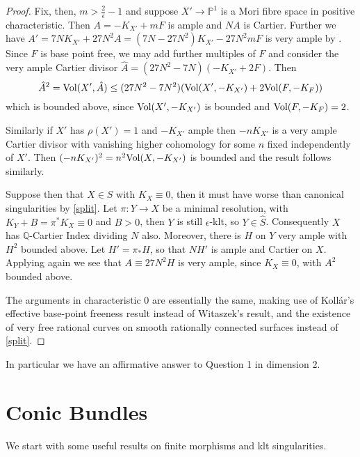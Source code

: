 \begin{proof}
	Fix, then, $m > \frac{2}{\epsilon}-1$ and suppose $X'\to \mathbb{P}^{1}$ is a Mori fibre space in positive characteristic. Then $A=-K_{X'} +mF$ is ample and $NA$ is Cartier. Further we have $A'=7NK_{X'}+27N^{2}A=(7N-27N^{2})K_{X'}-27N^{2}mF$ is very ample by \cite[Theorem 4.1]{witaszek2015effective}. Since $F$ is base point free, we may add further multiples of $F$ and consider the very ample Cartier divisor $\hat{A}=(27N^{2}-7N)(-K_{X'}+2F)$. Then $$\hat{A}^{2}=\text{Vol}(X',\hat{A})\leq (27N^{2}-7N^{2})(\text{Vol}(X',-K_{X'})+2\text{Vol}(F,-K_{F}))$$ which is bounded above, since $\text{Vol}(X',-K_{X'})$ is bounded and $\text{Vol}(F,-K_{F})=2$. 
	
	Similarly if $X'$ has $\rho(X')=1$ and $-K_{X'}$ ample then $-nK_{X'}$ is a very ample Cartier divisor with vanishing higher cohomology for some $n$ fixed independently of $X'$. Then $(-nK_{X'})^{2}=n^{2}\text{Vol}(X,-K_{X'})$ is bounded and the result follows similarly.
	
	Suppose then that $X \in S$ with $K_{X} \equiv 0$, then it must have worse than canonical singularities by \autoref{split}. Let $\pi\colon Y \to X$ be a minimal resolution, with $K_{Y}+B=\pi^{*}K_{X} \equiv 0$ and $B >0$, then $Y$ is still $\epsilon$-klt, so $Y \in \hat{S}$. Consequently $X$ has $\mathbb{Q}$-Cartier Index dividing $N$ also. Moreover, there is $H$ on $Y$ very ample with $H^{2}$ bounded above. Let $H'=\pi_{*}H$, so that $NH'$ is ample and Cartier on $X$. Applying \cite[Theorem 4.1]{witaszek2015effective} again we see that $A\equiv 27N^{2}H$ is very ample, since $K_{X}\equiv 0$, with $A^{2}$ bounded above.
	
	The arguments in characteristic $0$ are essentially the same, making use of Koll{\'a}r's effective base-point freeness result \cite[Theorem 1.1, Lemma 1.2]{kollar1993effective} instead of Witaszek's result, and the existence of very free rational curves on smooth rationally connected surfaces instead of \autoref{split}.
\end{proof}

\begin{remark}
	In particular we have an affirmative answer to Question 1 in dimension $2$.
\end{remark}


\section{Conic Bundles}
We start with some useful results on finite morphisms and klt singularities.

